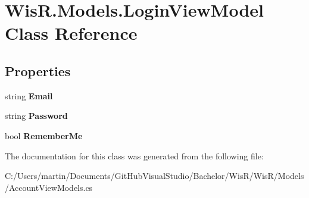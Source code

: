 \hypertarget{class_wis_r_1_1_models_1_1_login_view_model}{}\section{Wis\+R.\+Models.\+Login\+View\+Model Class Reference}
\label{class_wis_r_1_1_models_1_1_login_view_model}
\subsection*{Properties}
\begin{DoxyCompactItemize}
\item 
\hypertarget{class_wis_r_1_1_models_1_1_login_view_model_aa21e9cdbc59027e56a2e0b5a40cdc5d6}{}string {\bfseries Email}\label{class_wis_r_1_1_models_1_1_login_view_model_aa21e9cdbc59027e56a2e0b5a40cdc5d6}

\item 
\hypertarget{class_wis_r_1_1_models_1_1_login_view_model_a2b12f900bab2a4b698d37df180d62583}{}string {\bfseries Password}\label{class_wis_r_1_1_models_1_1_login_view_model_a2b12f900bab2a4b698d37df180d62583}

\item 
\hypertarget{class_wis_r_1_1_models_1_1_login_view_model_a99d6e03173d1e2a876226e5c777fff3a}{}bool {\bfseries Remember\+Me}\label{class_wis_r_1_1_models_1_1_login_view_model_a99d6e03173d1e2a876226e5c777fff3a}

\end{DoxyCompactItemize}


The documentation for this class was generated from the following file\+:\begin{DoxyCompactItemize}
\item 
C\+:/\+Users/martin/\+Documents/\+Git\+Hub\+Visual\+Studio/\+Bachelor/\+Wis\+R/\+Wis\+R/\+Models/Account\+View\+Models.\+cs\end{DoxyCompactItemize}
